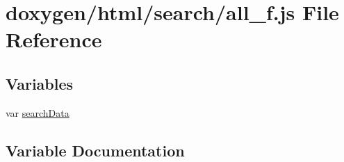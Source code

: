 \hypertarget{a00060}{}\section{doxygen/html/search/all\+\_\+f.js File Reference}
\label{a00060}
\subsection*{Variables}
\begin{DoxyCompactItemize}
\item 
var \hyperlink{a00060_ad01a7523f103d6242ef9b0451861231e}{search\+Data}
\end{DoxyCompactItemize}


\subsection{Variable Documentation}
\hypertarget{a00060_ad01a7523f103d6242ef9b0451861231e}{}
